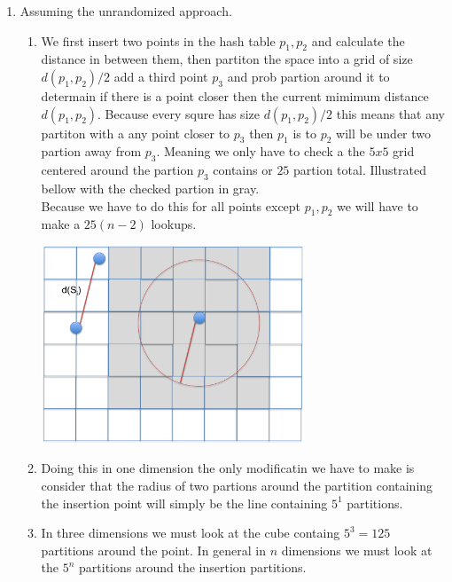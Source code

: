 \documentclass[11pt]{article}
\begin{document}
\begin{enumerate}
\begin{enumerate}
		\end{enumerate}
	\item Assuming the unrandomized approach.
		\begin{enumerate}
		\item We first insert two points in the hash table $p_1,p_2$ and calculate
			the distance in between them, then partiton the space
				into a grid of size $d(p_1,p_2)/2$ add a third point $p_3$ and
			prob partion around it to determain if there is a point
				closer then the current mimimum distance
				$d(p_1,p_2)$. Because every squre has
				size $d(p_1,p_2)/2$ this means that any partiton
				with a any point closer to $p_3$ then $p_1$ is
				to $p_2$ will be under two partion away from
				$p_3$. Meaning we only have to check a the $5x5$
				grid centered around the partion $p_3$ contains
				or $25$ partion total. 
				Illustrated bellow with the checked partion in
				gray.\\
				Because we have to do this for all points except
				$p_1,p_2$ we will have to make a $25(n-2)$
				lookups.
				
		\begin{center}
		\includegraphics[width=0.65\textwidth]{images/fig4}
		\end{center}
		\item Doing this in one dimension the only modificatin we have to
			make is consider that the radius of two partions around the
			partition containing the insertion point will simply be the
				line containing $5^1$ partitions.
		\item In three dimensions we must look at the cube containg $5^3
			= 125$ partitions around the point. In general in $n$
				dimensions we must look at the $5^n$ partitions
				around the insertion partitions.
		\end{enumerate}
\end{enumerate}
\end{document}
